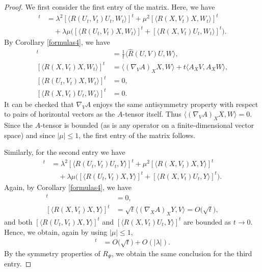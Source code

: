 \begin{proof}
	We first consider the first entry of the matrix. Here, we have
	\begin{align*}
		[\langle R(\Psi,V_t)\Psi,W_t\rangle]^t&{}=\lambda^2[\langle R(U_t,V_t)U_t,W_t\rangle]^t+\mu^2 [\langle R(X,V_t)X,W_t\rangle]^t\\
		&\quad{} + \lambda\mu\bigl([\langle R(U_t,V_t)X,W_t\rangle]^t + [\langle R(X,V_t)U_t,W_t\rangle]^t \bigr).
	\end{align*}
	By Corollary \ref{formulas4}, we have
	\begin{align*}
		[\langle R(U_t,V_t)U_t,W_t\rangle]^t &{}= \frac{1}{t}\bigl\langle \hat{R}(U,V)U,W\bigr\rangle,\\
		[\langle R(X,V_t)X,W_t\rangle]^t &{}= \langle (\nabla_V A)_X X,W\rangle +t\langle A_X V,A_X W\rangle,\\
		[\langle R(U_t,V_t)X,W_t\rangle]^t &{}=0,\\
		[\langle R(X,V_t)U_t,W_t\rangle]^t &{}=0.
	\end{align*}
	It can be checked that $\nabla_V A$ enjoys the same antisymmetry property with respect to pairs of horizontal vectors as the $A$-tensor itself. Thus $\langle (\nabla_V A)_X X,W\rangle=0$. Since the $A$-tensor is bounded (as is any operator on a finite-dimensional vector space) and since $|\mu|\leq 1$, the first entry of the matrix follows.
	
	Similarly, for the second entry we have
	\begin{align*}
		[\langle R(\Psi,V_t)\Psi,Y\rangle ]^t&{}= \lambda^2[\langle R(U_t,V_t)U_t,Y\rangle]^t+\mu^2 [\langle R(X,V_t)X,Y\rangle]^t\\
		&\quad{} + \lambda\mu\bigl([\langle R(U_t,V_t)X,Y\rangle]^t + [\langle R(X,V_t)U_t,Y\rangle]^t \bigr).
	\end{align*}
	Again, by Corollary \ref{formulas4}, we have
	\begin{align*}
		[\langle R(U_t,V_t)U_t,Y\rangle]^t&{}=0,\\
		[\langle R(X,V_t)X,Y\rangle]^t&{}=\sqrt{t}\langle(\nabla_X A)_X Y,V\rangle=O\bigl(\sqrt{t}\bigr),
	\end{align*}
	and both $[\langle R(U_t,V_t)X,Y\rangle]^t$ and $[\langle R(X,V_t)U_t,Y\rangle]^t$ are bounded as $t\to 0$. Hence, we obtain, again by using $|\mu|\leq 1$,
	\begin{align*}
		[\langle R(U_t,V_t)U_t,Y\rangle]^t&{}=O\bigl(\sqrt{t}\bigr)+O(|\lambda|).
	\end{align*}
	By the symmetry properties of $R_\Psi$, we obtain the same conclusion for the third entry.
	

\end{proof}
